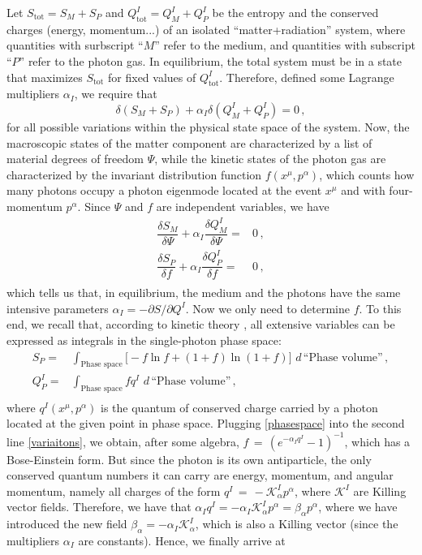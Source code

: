 \documentclass[a4paper, amsfonts, amssymb, amsmath, reprint, showkeys, nofootinbib, twoside, onecolumn,notitlepage]{revtex4-1}
\newcommand{\K}{{\mathcal{K}}}
\theoremstyle{definition}
\theoremstyle{theorem}
\begin{document}
Let $S_{\text{tot}}=S_M+S_P$ and $Q_{\text{tot}}^I=Q_M^I+Q_P^I$ be the entropy and the conserved charges (energy, momentum...) of an isolated ``matter+radiation'' system, where quantities with surbscript ``$M$'' refer to the medium, and quantities with subscript ``$P$'' refer to the photon gas. In equilibrium, the total system must be in a state that maximizes $S_{\text{tot}}$ for fixed values of $Q_{\text{tot}}^I$. Therefore, defined some Lagrange multipliers $\alpha_I$, we require that
\begin{equation}
\delta (S_M+S_P)+\alpha_I \delta (Q_M^I+Q_P^I) =0 \, ,
\end{equation}
for all possible variations within the physical state space of the system. Now, the macroscopic states of the matter component are characterized by a list of material degrees of freedom $\Psi$, while the kinetic states of the photon gas are characterized by the invariant distribution function $f(x^\mu,p^\alpha)$, which counts how many photons occupy a photon eigenmode located at the event $x^\mu$ and with four-momentum $p^\alpha$. Since $\Psi$ and $f$ are independent variables, we have
\begin{equation}\label{variaitons}
\begin{split}
\dfrac{\delta S_M}{\delta \Psi} +\alpha_I \dfrac{\delta Q_M^I}{\delta \Psi} ={}& 0 \, , \\ 
\dfrac{\delta S_P}{\delta f} +\alpha_I \dfrac{\delta Q_P^I}{\delta f} ={}& 0 \, , \\ 
\end{split}
\end{equation}
which tells us that, in equilibrium, the medium and the photons have the same intensive parameters $\alpha_I =-\partial S/\partial Q^I$. Now we only need to determine $f$. To this end, we recall that, according to kinetic theory \cite{cercignani_book,mihalas_book}, all extensive variables can be expressed as integrals in the single-photon phase space:
\begin{equation}\label{phasespace}
\begin{split}
S_P ={}& \int_{\text{Phase space}} \big[{-}f \ln f+(1{+}f)\ln (1{+}f)\big] \,\, d \, \text{``Phase volume''} \, , \\
Q_P^I ={}& \int_{\text{Phase space}} f q^I \,\, d \, \text{``Phase volume''} \, , \\
\end{split}
\end{equation}
where $q^I(x^\mu,p^\alpha)$ is the quantum of conserved charge carried by a photon located at the given point in phase space. Plugging \eqref{phasespace} into the second line \eqref{variaitons}, we obtain, after some algebra, $f\,{=}\,(e^{-\alpha_I q^I}{-}1)^{-1}$, which has a Bose-Einstein form. But since the photon is its own antiparticle, the only conserved quantum numbers it can carry are energy, momentum, and angular momentum, namely all charges of the form $q^I\,{=}\,{-} \K^I_\alpha p^\alpha$, where $\K^I$ are Killing vector fields. Therefore, we have that $\alpha_I q^I=-\alpha_I\K^I_\alpha p^\alpha=\beta_\alpha p^\alpha$, where we have introduced the new field $\beta_\alpha=-\alpha_I\K^I_\alpha$, which is also a Killing vector (since the multipliers $\alpha_I$ are constants). Hence, we finally arrive at
\end{document}
